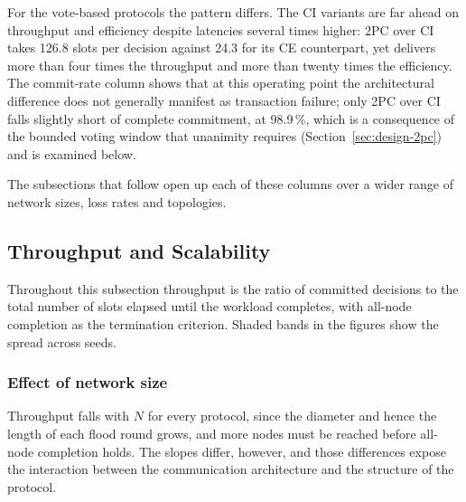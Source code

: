 \documentclass[journal]{IEEEtran}
\newcommand{\CI}{CI}                      %
\newcommand{\CE}{CE}                      %
\newcommand{\Nnodes}{N}                   %
\begin{document}
For the vote-based protocols the pattern differs. The \CI{} variants are
far ahead on throughput and efficiency despite latencies several times
higher: 2PC over \CI{} takes 126.8 slots per decision against 24.3 for
its \CE{} counterpart, yet delivers more than four times the throughput
and more than twenty times the efficiency. The commit-rate column shows
that at this operating point the architectural difference does not
generally manifest as transaction failure; only 2PC over \CI{} falls
slightly short of complete commitment, at 98.9\,\%, which is a
consequence of the bounded voting window that unanimity requires
(Section~\ref{sec:design-2pc}) and is examined below.

The subsections that follow open up each of these columns over a wider
range of network sizes, loss rates and topologies.

\subsection{Throughput and Scalability}
\label{sec:results-throughput}

Throughout this subsection throughput is the ratio of committed decisions
to the total number of slots elapsed until the workload completes, with
all-node completion as the termination criterion. Shaded bands in the
figures show the spread across seeds.

\subsubsection{Effect of network size}


Throughput falls with $\Nnodes$ for every protocol, since the diameter
and hence the length of each flood round grows, and more nodes must be
reached before all-node completion holds. The slopes differ, however, and
those differences expose the interaction between the communication
architecture and the structure of the protocol.
\end{document}
